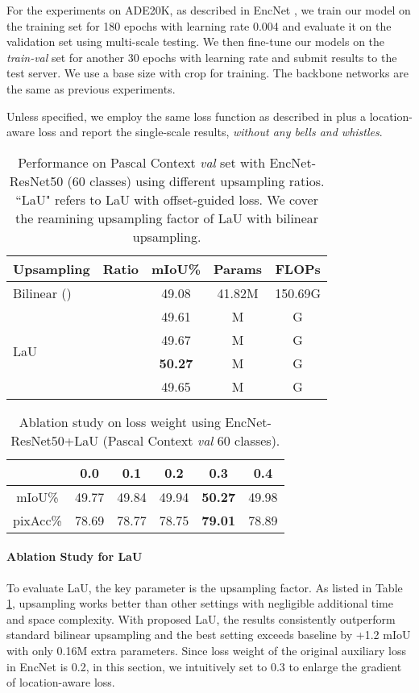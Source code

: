\documentclass[10pt,twocolumn,letterpaper]{article}
\begin{document}
For the experiments on ADE20K, as described in EncNet \cite{EncNet}, we train our model on the training set for 180 epochs with learning rate 0.004 and evaluate it on the validation set using multi-scale testing. We then fine-tune our models on the \textit{train-val} set for another 30 epochs with learning rate  and submit results to the test server. We use a  base size with  crop for training. The backbone networks are the same as previous experiments.

Unless specified, we employ the same loss function as described in \cite{ASPP, EncNet} plus a location-aware loss and report the single-scale results, \textit{without any bells and whistles}.

\begin{table}[t]
  \caption{Performance on Pascal Context \textit{val} set with EncNet-ResNet50 (60 classes) using different upsampling ratios. ``LaU" refers to LaU with offset-guided loss. We cover the reamining upsampling factor of LaU with bilinear upsampling.}\label{sample-table}
  \centering
\begin{tabular}{lcccc}
\hline 
    Upsampling     & Ratio     & mIoU\% & Params & FLOPs\\
\hline   
\hline
 Bilinear (\cite{EncNet}) &  & 49.08 & 41.82M  & 150.69G\\
\hline 
    \multirow{4}{*}{LaU} &  & 49.61 & M & G\\
    &  & 49.67 & M & G\\
    &  & \textbf{50.27} & M & G\\
    &  & 49.65 & M & G\\
\hline 
  \end{tabular}
\label{diffratio}
\end{table}

\begin{table}[t]
  \caption{Ablation study on loss weight  using EncNet-ResNet50+LaU (Pascal Context \textit{val} 60 classes).}\label{sample-table}
  \centering
\begin{tabular}{cccccc}
\hline 
       & 0.0   & 0.1 & 0.2 & 0.3 & 0.4\\
\hline   
\hline
 mIoU\% & 49.77  & 49.84 & 49.94 & \textbf{50.27} & 49.98 \\
pixAcc\% & 78.69 & 78.77 & 78.75 & \textbf{79.01} & 78.89 \\
\hline 
  \end{tabular}
\label{lambda}
\end{table}

\paragraph{Ablation Study for LaU}
To evaluate LaU, the key parameter is the upsampling factor. As listed in Table \ref{diffratio},  upsampling works better than other settings with negligible additional time and space complexity. With proposed LaU, the results consistently outperform standard bilinear upsampling and the best setting exceeds baseline by +1.2 mIoU with only 0.16M extra parameters. Since loss weight of the original auxiliary loss in EncNet is 0.2, in this section, we intuitively set  to 0.3 to enlarge the gradient of location-aware loss.
\end{document}

